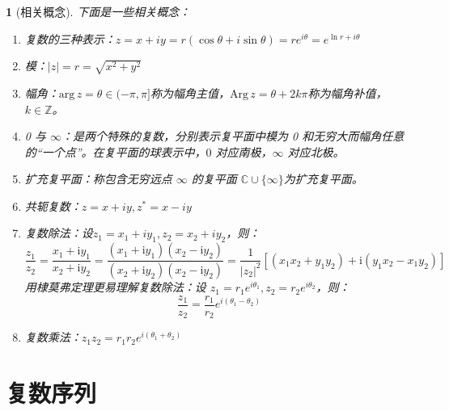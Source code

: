\documentclass[zihao=5,UTF8]{report}
\def\Z{\mathbb{Z}}
\def\C{\mathbb{C}}
\def\arg{\mathrm{arg}\,}
\def\Arg{\mathrm{Arg}\,}
\theoremstyle{MyLineTheoremStyle} %
\theoremstyle{MyBlockTheoremStyle} %
\theoremstyle{MySubsubsectionStyle} %
\newtheorem{definition}{}
\begin{document}
\begin{definition}[相关概念] 
    下面是一些相关概念：
\begin{enumerate}
    \item 复数的三种表示：$z = x + iy = r(\cos \theta + i\sin \theta) =  re^{i\theta} = e^{\ln r + i\theta}$
    \item 模：$|z| = r =\sqrt{x^2+y^2}$
    \item 幅角：$\arg z = \theta \in (-\pi, \pi]$称为幅角主值，$\Arg z = \theta + 2k\pi$称为幅角补值，$k\in\Z$。
    \item 0 与 $\infty$：是两个特殊的复数，分别表示复平面中模为 0 和无穷大而幅角任意的“一个点”。在复平面的球表示中，$0$ 对应南极，$\infty$ 对应北极。
    \item 扩充复平面：称包含无穷远点 $\infty$ 的复平面 $\C \cup \{\infty\}$为扩充复平面。
    \item 共轭复数：$ z = x + iy, z^* = x - iy$
    \item 复数除法：设$z_1 = x_1 + iy_1, z_2 = x_2 + iy_2$，则：
    \begin{equation}
    \frac{z_1}{z_2}= \frac{x_1+\mathrm{i}y_1}{x_2+\mathrm{i}y_2}=\frac{(x_1+\mathrm{i}y_1)(x_2-\mathrm{i}y_2)}{(x_2+\mathrm{i}y_2)(x_2-\mathrm{i}y_2)} = \frac{1}{| z_2 |^2}\left[ (x_1x_2+y_1y_2) + \mathrm{i}(y_1x_2-x_1y_2) \right]
    \end{equation}
    用棣莫弗定理更易理解复数除法：设 $z_1 = r_1e^{i\theta_1}, z_2 = r_2e^{i\theta_2}$，则： 
    \begin{equation}
    \frac{z_1}{z_2} = \frac{r_1}{r_2}e^{i(\theta_1-\theta_2)}
    \end{equation}
    \item 复数乘法：$z_1z_2 = r_1r_2e^{i(\theta_1+\theta_2)}$
\end{enumerate}



\end{definition}


\section{复数序列}
\end{document}
